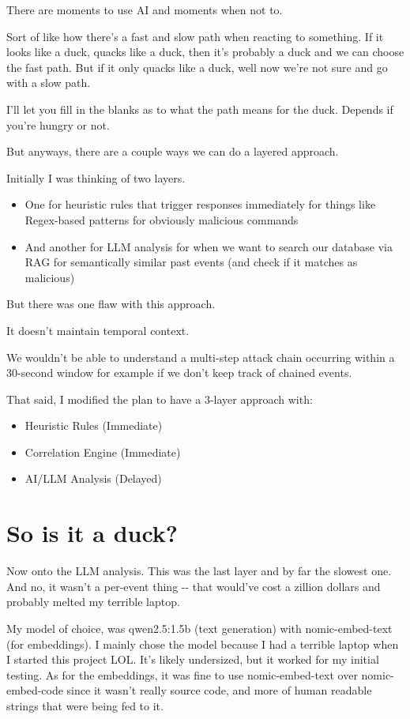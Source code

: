 There are moments to use AI and moments when not to.

Sort of like how there's a fast and slow path when reacting to something. If it looks like a duck, quacks like a duck, then it's probably a duck and we can choose the fast path. But if it only quacks like a duck, well now we're not sure and go with a slow path.

I'll let you fill in the blanks as to what the path means for the duck. Depends if you're hungry or not.

But anyways, there are a couple ways we can do a layered approach.

Initially I was thinking of two layers.

\begin{itemize}
\item One for heuristic rules that trigger responses immediately for things like Regex-based patterns for obviously malicious commands
\item And another for LLM analysis for when we want to search our database via RAG for semantically similar past events (and check if it matches as malicious)
\end{itemize}

But there was one flaw with this approach.

It doesn't maintain temporal context.

We wouldn't be able to understand a multi-step attack chain occurring within a 30-second window for example if we don't keep track of chained events.

That said, I modified the plan to have a 3-layer approach with:

\begin{itemize}
\item Heuristic Rules (Immediate)
\item Correlation Engine (Immediate)
\item AI/LLM Analysis (Delayed)
\end{itemize}

\section{So is it a duck?}

Now onto the LLM analysis. This was the last layer and by far the slowest one. And no, it wasn't a per-event thing -{}- that would've cost a zillion dollars and probably melted my terrible laptop.

My model of choice, was qwen2.5:1.5b (text generation) with nomic-embed-text (for embeddings). I mainly chose the model because I had a terrible laptop when I started this project LOL. It's likely undersized, but it worked for my initial testing. As for the embeddings, it was fine to use nomic-embed-text over nomic-embed-code since it wasn't really source code, and more of human readable strings that were being fed to it.

